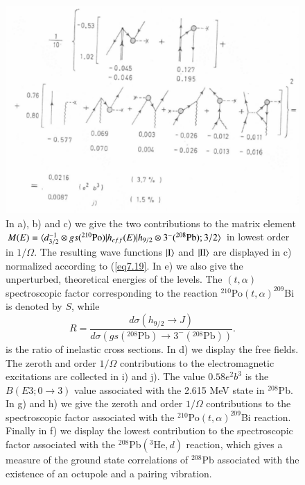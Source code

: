                    \begin{figure}
                   \captionsetup{singlelinecheck=off}
                   \centerline {
                   \includegraphics*[width=12cm]{introduccion/figs/fig24c}
                   }
                   \caption[.]{In a), b) and c) we give the two contributions to the matrix element $M(E)=\langle {d_{3/2}^{-1}\otimes gs(^{210}\text{Po})|h_{eff}(E)|h_{9/2}\otimes 3^-(^{208}\text{Pb});3/2} \rangle$ in lowest order in $1/\Omega.$ The resulting wave functions $|{\text{I}} \rangle$ and $|{\text{II}} \rangle$ are displayed in c) normalized according to (\ref{eq7.19}. In e) we also give the unperturbed, theoretical energies of the levels. The $(t,\alpha)$ spectroscopic factor corresponding to the reaction $^{210}$Po$(t,\alpha)^{209}$Bi is denoted by $S$, while 
                   \begin{equation*}
                   R=\frac{d\sigma(h_{9/2}\rightarrow J)}{d\sigma(gs(^{208}\text{Pb})\rightarrow3^-(^{208}\text{Pb}))}.
                   \end{equation*}
                   is the ratio of inelastic cross sections. In d) we display the free fields. The zeroth and order $1/\Omega$ contributions to the electromagnetic excitations are collected in i) and j). The value $0.58 e^2b^3$ is the $B(E3;0\rightarrow 3)$ value associated with the 2.615 MeV state in $^{208}$Pb. In g) and h) we give the zeroth and order $1/\Omega$ contributions to the spectroscopic factor associated with the $^{210}$Po$(t,\alpha)^{209}$Bi reaction. Finally in f) we display the lowest contribution to the spectroscopic factor associated with the $^{208}$Pb$(^3\text{He},d)$ reaction, which gives a measure of the ground state correlations of $^{208}$Pb associated with the existence of an octupole and a pairing vibration.}
                   \label{figC1A7}
                   \end{figure}
